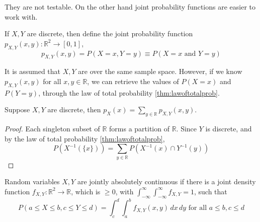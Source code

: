 \noindent They are not testable. On the other hand joint probability functions are easier to work with.

\begin{definition}
    If $X, Y$ are discrete, then define the joint probability function $p_{X, Y}(x, y): \mathbb{R}^2 \to [0, 1]$,
\[
    p_{X, Y}(x, y) = P(X = x, Y = y) \equiv P(X = x \text{ and } Y = y)
\]
\end{definition}

It is assumed that $X, Y$ are over the same sample space. However, if we know $p_{X, Y}(x, y)$ for all $x, y \in \mathbb{R}$, we can retrieve the values of $P(X = x)$ and $P(Y = y)$, through the law of total probability \ref{thm:lawoftotalprob}.

\begin{simplethm}[Marginals]
    Suppose $X, Y$ are discrete, then 
    $p_X(x) = \sum_{y \in \mathbb{R}} p_{X, Y}(x, y)$.
\end{simplethm}

\begin{proof}
    Each singleton subset of $\mathbb{R}$ forms a partition of $\mathbb{R}$. Since $Y$ is discrete, and by the law of total probability \ref{thm:lawoftotalprob}, 
    \[
    P(X ^{-1}(\{ x \})) = \sum_{y \in \mathbb{R}} P(X ^{-1} (x) \cap Y ^{-1} (y))
    \]
\end{proof}

\begin{definition}
    Random variables $X, Y$ are jointly absolutely continuous if there is a joint density function $f_{X, Y} : \mathbb{R}^2 \to \mathbb{R}$, which is $\geq 0$, with $\int_{-\infty}^{\infty} \int_{-\infty}^{\infty} f_{X, Y} = 1$, such that
    \[
    P(a \leq X \leq b, c \leq Y \leq d) = \int_c^d \int_a^b f_{X, Y}(x, y) \, dx \, dy \text{ for all } a \leq b, c \leq d
    \]
\end{definition}
